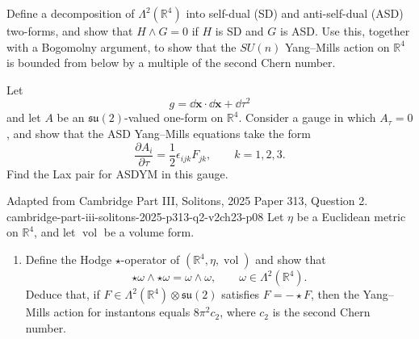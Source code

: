 \begin{enumerate}
  Define a decomposition of \(\Lambda^2(\mathbb R^4)\) into self-dual
  (SD) and anti-self-dual (ASD) two-forms, and show that
  \(H\wedge G=0\) if \(H\) is SD and \(G\) is ASD.  Use this, together
  with a Bogomolny argument, to show that the \(SU(n)\) Yang--Mills
  action on \(\mathbb R^4\) is bounded from below by a multiple of the
  second Chern number.

  Let
  \[
    g=\dd\mathbf x\cdot \dd\mathbf x+\dd\tau^2
  \]
  and let \(A\) be an \(\mathfrak{su}(2)\)-valued one-form on
  \(\mathbb R^4\).  Consider a gauge in which \(A_\tau=0\), and show that
  the ASD Yang--Mills equations take the form
  \[
    \frac{\partial A_i}{\partial\tau}
      =\frac12\epsilon_{ijk}F_{jk},
    \qquad k=1,2,3.
  \]
  Find the Lax pair for ASDYM in this gauge.

  {Adapted from Cambridge Part III, Solitons, 2025 Paper 313,
  Question 2.}
  {cambridge-part-iii-solitons-2025-p313-q2-v2ch23-p08}
  Let \(\eta\) be a Euclidean metric on \(\mathbb R^4\), and let
  \(\operatorname{vol}\) be a volume form.
  \begin{enumerate}
    \item[(i)]
    Define the Hodge \(\star\)-operator of
    \((\mathbb R^4,\eta,\operatorname{vol})\) and show that
    \[
      \star\omega\wedge\star\omega=\omega\wedge\omega,
      \qquad \omega\in\Lambda^2(\mathbb R^4).
    \]
    Deduce that, if
    \(F\in\Lambda^2(\mathbb R^4)\otimes\mathfrak{su}(2)\) satisfies
    \(F=-\star F\), then the Yang--Mills action for instantons equals
    \(8\pi^2c_2\), where \(c_2\) is the second Chern number.


\end{enumerate}
\end{enumerate}

